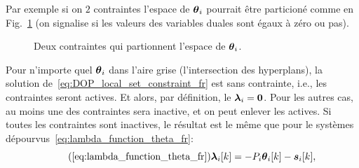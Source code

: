\documentclass[../main.tex]{subfiles}
\begin{document}
Par exemple si on $2$ contraintes l'espace de $\boldsymbol{\theta}_{i}$ pourrait être particioné comme en Fig.~\ref{fig:constraints_partition_theta_fr} (on signalise si les valeurs des variables duales sont égaux à zéro ou pas).
\begin{figure}[h]
  \centering
  \caption{Deux contraintes qui partionnent l'espace de $\boldsymbol{\theta}_{i}$.}\label{fig:constraints_partition_theta_fr}
\end{figure}

Pour n'importe quel $\boldsymbol{\theta}_{i}$ dans l'aire grise (l'intersection des hyperplans), la solution de~\eqref{eq:DOP_local_set_constraint_fr} est sans contrainte, i.e., les contraintes seront actives.
Et alors, par définition, le $\boldsymbol{\lambda}_{i}=\mathbf{0}$.
Pour les autres cas, au moins une des contraintes sera inactive, et on peut enlever les actives.
Si toutes les contraintes sont inactives, le résultat est le même que pour le systèmes dépourvus~\eqref{eq:lambda_function_theta_fr}:
\begin{equation}
  \label{eq:lambda_function_theta_reprise_fr}
  \tag{\ref*{eq:lambda_function_theta_fr}}
  \lambdaik=-\Plin\thetaik-\sik,
\end{equation}
\newcommand{\Plinineqnonzero}[1][\star]{\overset{#1}{\Plin}}
\newcommand{\sikineqnonzero}[1][\star]{\overset{#1}{\vec{s}_{i}}[k]}
\end{document}
